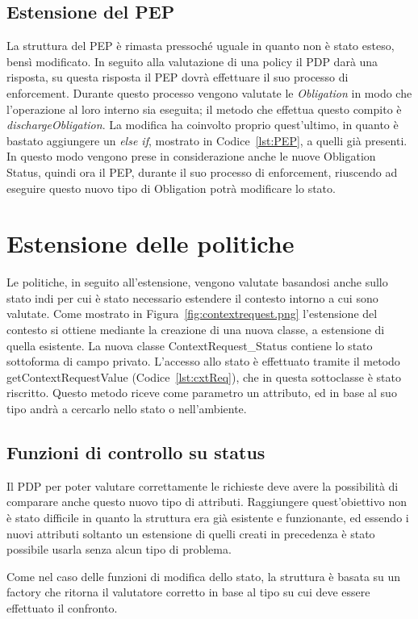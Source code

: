 \subsection{Estensione del PEP}
\label{sub:estensione_PEP}
La struttura del \ac{PEP} è rimasta pressoché uguale in quanto non è stato esteso, bensì modificato.
In seguito alla valutazione di una policy il \ac{PDP} darà una risposta, su questa risposta il \ac{PEP} dovrà effettuare il suo processo di enforcement.
Durante questo processo vengono valutate le \textit{Obligation} in modo che l'operazione al loro interno sia eseguita; il metodo che effettua questo compito è 
\textit{dischargeObligation}. La modifica ha coinvolto proprio quest'ultimo, in quanto è bastato aggiungere un \textit{else if}, mostrato in Codice~\ref{lst:PEP}, a quelli già presenti.
In questo modo vengono prese in considerazione anche le nuove Obligation Status, quindi ora il \ac{PEP}, durante il suo processo di enforcement, riuscendo ad eseguire questo nuovo tipo di Obligation potrà modificare lo stato.


\section{Estensione delle politiche}
\label{sec:estensione_politiche}

Le politiche, in seguito all'estensione, vengono valutate basandosi anche sullo stato indi per cui è stato necessario estendere il contesto intorno a cui sono valutate. Come mostrato in Figura~\ref{fig:contextrequest.png} l'estensione del contesto si ottiene mediante la creazione di una nuova classe, a estensione di quella esistente.
La nuova classe ContextRequest\_Status contiene lo stato sottoforma di campo privato. L'accesso allo stato è effettuato tramite il metodo getContextRequestValue (Codice~\ref{lst:cxtReq}), che in questa sottoclasse è stato riscritto.
Questo metodo riceve come parametro un attributo, ed in base al suo tipo andrà a cercarlo nello stato o nell'ambiente.

\subsection{Funzioni di controllo su status}
\label{sub:funzioni_controllo_status}

Il \ac{PDP} per poter valutare correttamente le richieste deve avere la possibilità di comparare anche questo nuovo tipo di attributi.
Raggiungere quest'obiettivo non è stato difficile in quanto la struttura era già esistente e funzionante, ed essendo i nuovi attributi soltanto un estensione di quelli 
creati in precedenza è stato possibile usarla senza alcun tipo di problema.\par
\centering
{}
\flushleft
Come nel caso delle funzioni di modifica dello stato, la struttura è basata su un factory che ritorna il valutatore corretto in base al tipo su cui deve essere effettuato il confronto.

